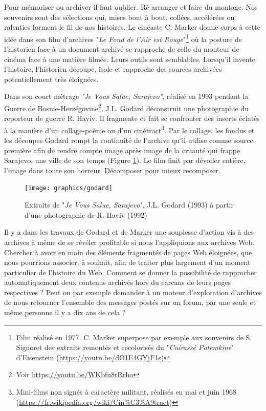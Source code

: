 \documentclass[symmetric,justified,marginals=raggedouter]{tufte-book}
\begin{document}
Pour mémoriser ou archiver il faut oublier. Ré-arranger et faire du montage. Nos souvenirs sont des sélections qui, mises bout à bout, collées, accélérées ou ralenties forment le fil de nos histoires. Le cinéaste C. Marker donne corps à cette idée dans son film d'archives "\textit{Le Fond de l'Air est Rouge}"\footnote{Film réalisé en 1977. C. Marker superpose par exemple aux souvenirs de S. Signoret des extraits remontés et recolorisés du "\textit{Cuirassé Potemkine}" d'Eisenstein (\url{https://youtu.be/dO1E4GYjF1s})} où la posture de l'historien face à un document archivé se rapproche de celle du monteur de cinéma face à une matière filmée. Leurs outils sont semblables. Lorsqu'il invente l'histoire, l'historien découpe, isole et rapproche des sources archivées potentiellement très éloignées. 

Dans son court métrage \textit{"Je Vous Salue, Sarajevo"}, réalisé en 1993 pendant la Guerre de Bosnie-Herzégovine\footnote{Voir \url{https://youtu.be/WKbfu8rRrho}}, J.L. Godard déconstruit une photographie du reporteur de guerre R. Haviv. Il fragmente et fait se confronter des inserts éclatés à la manière d'un collage-poème ou d'un cinétract\footnote{Mini-films non signés à caractère militant, réalisés en mai et juin 1968 (\url{https://fr.wikipedia.org/wiki/Cin\%C3\%A9tract})}. Par le collage, les fondus et les découpes Godard rompt la continuité de l'archive qu'il utilise comme source première afin de rendre compte image après image de la cruauté qui frappe Sarajevo, une ville de son temps (Figure \ref{fig:godard}). Le film finit par dévoiler entière, l'image dans toute son horreur. Décomposer pour mieux recomposer.

\begin{figure}
  \texttt{[image: graphics/godard]}
  \caption{Extraits de "\textit{Je Vous Salue, Sarajevo}", J.L. Godard (1993) à partir d'une photographie de R. Haviv (1992)}
  \label{fig:godard}
\end{figure}

Il y a dans les travaux de Godard et de Marker une souplesse d'action vis à des archives à même de se révéler profitable si nous l'appliquions aux archives Web. Chercher à avoir en main des éléments fragmentés de pages Web éloignées, que nous pourrions associer, à souhait, afin de traiter plus largement d'un moment particulier de l'histoire du Web. Comment se donner la possibilité de rapprocher automatiquement deux contenus archivés hors du carcans de leurs pages respectives ? Peut on par exemple demander à un moteur d'exploration d'archives de nous retourner l'ensemble des messages postés sur un forum, par une seule et même personne il y a dix ans de cela ?  
\end{document}
